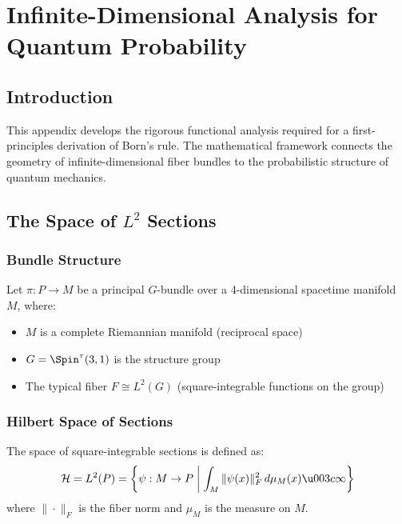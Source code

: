 \section{Infinite-Dimensional Analysis for Quantum Probability}
\label{app:infinite_dim_analysis}

\subsection{Introduction}

This appendix develops the rigorous functional analysis required for a first-principles derivation of Born's rule. The mathematical framework connects the geometry of infinite-dimensional fiber bundles to the probabilistic structure of quantum mechanics.

\subsection{The Space of $L^2$ Sections}

\subsubsection{Bundle Structure}

Let $\pi: P \to M$ be a principal $G$-bundle over a 4-dimensional spacetime manifold $M$, where:
\begin{itemize}
    \item $M$ is a complete Riemannian manifold (reciprocal space)
    \item $G = \Spin^\tau(3,1)$ is the structure group
    \item The typical fiber $F \cong L^2(G)$ (square-integrable functions on the group)
\end{itemize}

\subsubsection{Hilbert Space of Sections}

\begin{definition}
The space of square-integrable sections is defined as:
\begin{equation}
    \mathcal{H} = L^2(P) = \left\{ \psi: M \to P \;\middle|\; \int_M \|\psi(x)\|_F^2 \, d\mu_M(x) \u003c \infty \right\}
\end{equation}
where $\|\cdot\|_F$ is the fiber norm and $\mu_M$ is the measure on $M$.
\end{definition}

